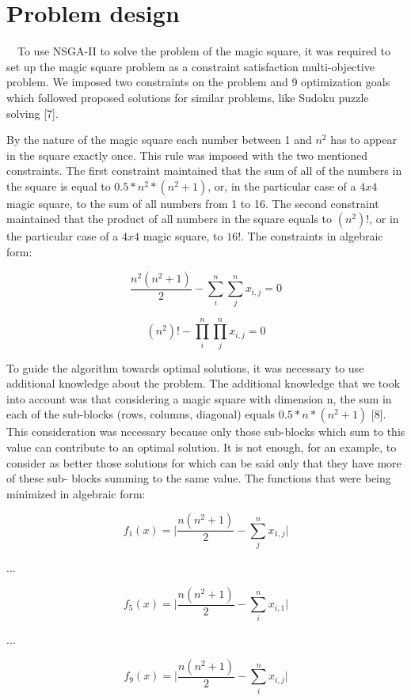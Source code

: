 \providecommand{\abs}[1]{\lvert#1\rvert}

\chapter[Problem design]{\label{identificadorReferenciaCruzada}
Problem design}

\ \ To use NSGA-II to solve the problem of the magic square, it was required to set up the magic square problem as a constraint satisfaction multi-objective problem. We imposed two constraints on the problem and 9 optimization goals which followed proposed solutions for similar problems, like Sudoku puzzle solving [7].

By the nature of the magic square each number between 1 and $n^2$ has to appear in the square exactly once. This rule was imposed with the two mentioned constraints. The  first constraint maintained that the sum of all of the numbers in the square is equal to $0.5 * n^2 * (n^2 + 1)$, or, in the particular case of a $4 x 4$ magic square, to the sum of all numbers from 1 to 16. The second constraint maintained that the product of all numbers in the square equals to $(n^2)!$, or in the particular case of a $4 x 4$ magic square, to $16!$. The constraints in algebraic form:

\begin{equation}
\frac{n^{2}(n^{2} +1)}{2} - \sum_{i}^n \sum_{j}^n x_{i,j} = 0
\end{equation}

\begin{equation}
(n^2)! - \prod_{i}^{n} \prod_{j}^{n} x_{i,j} = 0
\end{equation}

To guide the algorithm towards optimal solutions, it was necessary to use additional knowledge about the problem. The additional knowledge that we took into account was that considering a magic square with dimension n, the sum in each of the sub-blocks (rows, columns, diagonal) equals $0.5 * n * (n^2 + 1)$ [8]. This consideration was necessary because only those sub-blocks which sum to this value can contribute to an optimal solution. It is not enough, for an example, to consider as better those solutions for which can be said only that they have more of these sub- blocks summing to the same value. The functions that were being minimized in algebraic form:

\begin{equation}
f_{1}(x) = \abs{\frac{n(n^2+1)}{2}-\sum_{j}^n x_{1,j}}
\end{equation}
\begin{center}
...
\end{center}
\begin{equation}
f_{5}(x) = \abs{\frac{n(n^2+1)}{2}-\sum_{i}^n x_{i,1}}
\end{equation}
\begin{center}
...
\end{center}
\begin{equation}
f_{9}(x) = \abs{\frac{n(n^2+1)}{2}-\sum_{i}^n x_{i,j}}
\end{equation}

